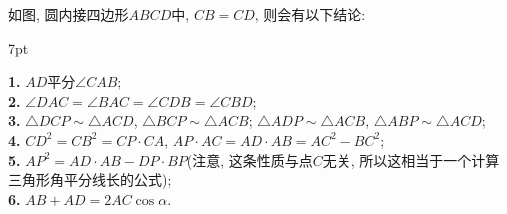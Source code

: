 \documentclass{book}
\newenvironment{theorem}{%
\def\FrameCommand{%
\hspace{1pt}%
{\color{cyan!60!blue}\vrule width 2pt}%
{\color{cyan!10}\vrule width 4pt}%
\colorbox{cyan!10}%
}%
\MakeFramed{\advance\hsize-\width\FrameRestore}%
\noindent\hspace{-4.55pt}%
\begin{adjustwidth}{}{7pt}%
\vspace{2pt}\vspace{2pt}%
}
{%
\vspace{2pt}\end{adjustwidth}\endMakeFramed%
}
\begin{document}
\begin{paracol}{2}
\switchcolumn
如图, 圆内接四边形$ABCD$中, $CB=CD$, 则会有以下结论: 
\begin{theorem}
	\kaishu 
	\textbf{1. }$AD$平分$\angle CAB$;\\
	\textbf{2. }$\angle DAC=\angle BAC=\angle CDB=\angle CBD$;\\
	\textbf{3. }$\triangle DCP\sim\triangle ACD$, $\triangle BCP\sim\triangle ACB$; $\triangle ADP\sim\triangle ACB$, $\triangle ABP\sim\triangle ACD$;\\
	\textbf{4. }$CD^2=CB^2=CP\cdot CA$, $AP\cdot AC=AD\cdot AB=AC^2-BC^2$;\\
	\textbf{5. }$AP^2=AD\cdot AB-DP\cdot BP$(注意, 这条性质与点$C$无关, 所以这相当于一个计算三角形角平分线长的公式);\\
	\textbf{6. }$AB+AD=2AC\cos{\alpha}$.
\end{theorem}


\end{paracol}
\end{document}
